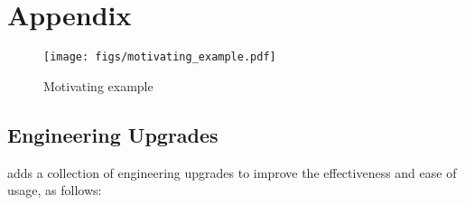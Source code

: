 \section{Appendix}



\begin{figure*}[!hbp]
\centerline{\texttt{[image: figs/motivating\_example.pdf]}}
\caption{Motivating example}
\label{fig:motivating}
\end{figure*}

\subsection{Engineering Upgrades}
\label{sec:engineering}
\bedrockfuzz adds a collection of engineering upgrades to improve the effectiveness and ease of usage, as follows:

